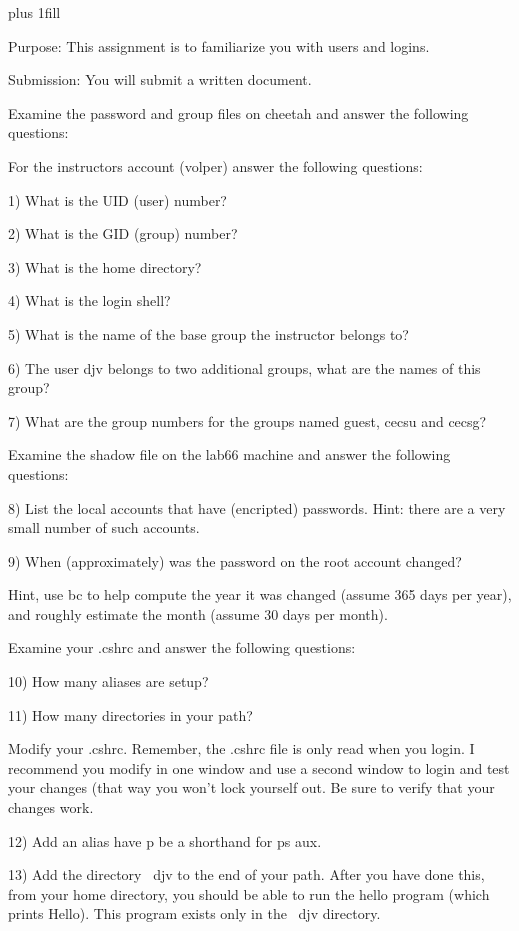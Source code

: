 
\rightskip=0pt plus 1fill

\parindent 0pt

Purpose: This assignment is to familiarize you with users and logins.

Submission: You will submit a written document.

Examine the password and group files on {\ltt{}cheetah}
and answer the following questions:

For the instructors account ({\ltt{}volper}) answer the following
questions:

1) What is the UID (user) number?

2) What is the GID (group) number?

3) What is the home directory?

4) What is the login shell?

5) What is the name of the base group the instructor belongs to?

6) The user {\ltt{}djv} belongs to two additional groups,
what are the names of this group?

7) What are the group numbers for the groups named {\ltt{}guest},
{\ltt{}cecsu} and {\ltt{}cecsg}?

Examine the shadow file on the {\ltt{}lab66} machine
and answer the following questions:

8) List the local accounts that have (encripted) passwords.
Hint: there are a very small number of such accounts.

9) When (approximately) was the password on the root account changed?

Hint, use bc to help compute the year it was changed (assume
365 days per year), and roughly estimate the month 
(assume 30 days per month).

Examine your {\ltt{}.cshrc} and answer the following questions:

10) How many aliases are setup?

11) How many directories in your path?

Modify your {\ltt{}.cshrc}.
Remember, the {\ltt{}.cshrc} file is only read when you login.
I recommend you modify in one window and use a second window
to login and test your changes (that way you won't lock yourself out.
Be sure to verify that your changes work.

12) Add an alias have {\ltt{}p} be a shorthand for {\ltt{}ps aux}.

13) Add the directory {\ltt{}~djv} to the end of your path.
After you have done this, from your home directory, you should be
able to run the {\ltt{}hello} program (which prints {\ltt{}Hello}).
This program exists only in the {\ltt{}~djv} directory.

\bye

